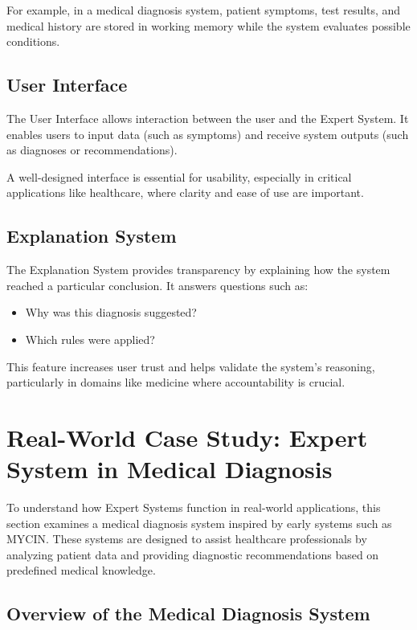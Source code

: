 \documentclass[12pt]{article}
\begin{document}
For example, in a medical diagnosis system, patient symptoms, test results, and medical history are stored in working memory while the system evaluates possible conditions.

\subsection{User Interface}

The User Interface allows interaction between the user and the Expert System. It enables users to input data (such as symptoms) and receive system outputs (such as diagnoses or recommendations).

A well-designed interface is essential for usability, especially in critical applications like healthcare, where clarity and ease of use are important.

\subsection{Explanation System}

The Explanation System provides transparency by explaining how the system reached a particular conclusion. It answers questions such as:
\begin{itemize}
    \item Why was this diagnosis suggested?
    \item Which rules were applied?
\end{itemize}

This feature increases user trust and helps validate the system’s reasoning, particularly in domains like medicine where accountability is crucial.


\newpage
\section{Real-World Case Study: Expert System in Medical Diagnosis}

To understand how Expert Systems function in real-world applications, this section examines a medical diagnosis system inspired by early systems such as MYCIN. These systems are designed to assist healthcare professionals by analyzing patient data and providing diagnostic recommendations based on predefined medical knowledge.

\subsection{Overview of the Medical Diagnosis System}
\end{document}
